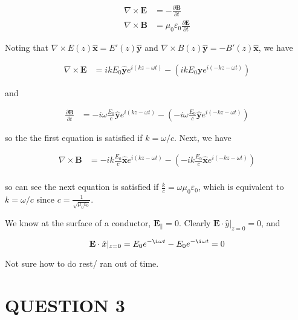 \documentclass[a4paper]{article}
\begin{document}
\begin{align*}
\nabla  \times \mathbf{E} & = - \frac{\partial \mathbf{B} }{\partial t} \\
\nabla  \times \mathbf{B} & = \mu_{0}\varepsilon_{0} \frac{\partial \mathbf{E} }{\partial t} 
\end{align*}

Noting that $ \nabla \times E(z) \hat{\mathbf{x}} = E'(z) \hat{\mathbf{y}} $ and $ \nabla \times B(z) \hat{\mathbf{y}} = - B'(z) \hat{\mathbf{x}} $, we have 

\begin{align*}
\nabla  \times \mathbf{E} & = i k E_{0} \hat{\mathbf{y}} e^{i(kz - \omega t)} - ( ik E_{0} \hat{\mathbf{y}} e^{i(-kz - \omega t)}  )
\end{align*}

and

\begin{align*}
\frac{\partial \mathbf{B} }{\partial t} & = - i \omega \frac{E_{0}}{c} \hat{\mathbf{y}} e^{i(kz - \omega t)} - ( - i \omega \frac{E_{0}}{c} \hat{\mathbf{y}} e^{i(-kz - \omega t)} )
\end{align*}

so the the first equation is satisfied if $ k = \omega / c  $. Next, we have 

\begin{align*}
\nabla \times \mathbf{B }& = - ik \frac{E_{0}}{c} \hat{\mathbf{x}} e^{i(kz - \omega t)} -  (- ik \frac{E_{0}}{c} \hat{\mathbf{x}} e^{i(-kz - \omega t)} )  \\
\end{align*}

so can see the next equation is satisfied if $ \frac{k}{c} = \omega \mu_{0} \varepsilon_{0} $, which is equivalent to $ k = \omega / c $ since $ c = \frac{1}{\sqrt{\mu_{0} \varepsilon_{0} }} $.

We know at the surface of a conductor, $ \mathbf{E}_{\parallel} =  0 $. Clearly $ \mathbf{E} \cdot \hat{y}|_{z = 0} = 0 $, and 


\[  \mathbf{E} \cdot \hat{x}|_{z = 0} = E_{0} e^{-\i \omega t} - E_{0} e^{-\i \omega t} = 0 \]


Not sure how to do rest/ ran out of time.








\section{QUESTION 3}
\end{document}
